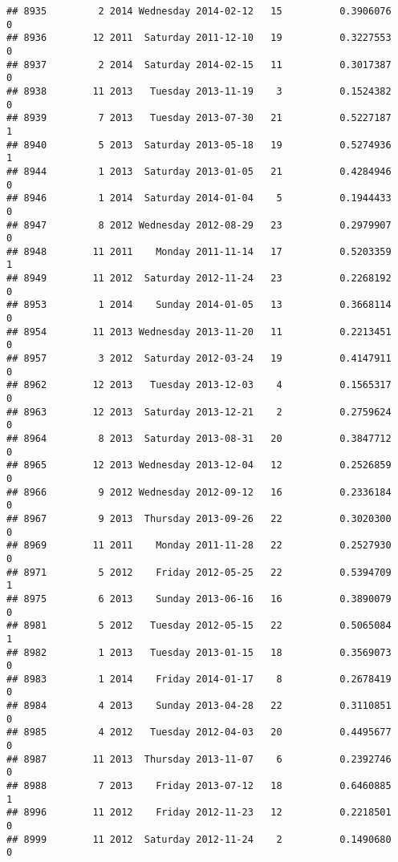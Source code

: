 \documentclass[
]{article}
\begin{document}
\begin{verbatim}
## 8935         2 2014 Wednesday 2014-02-12   15          0.3906076             0
## 8936        12 2011  Saturday 2011-12-10   19          0.3227553             0
## 8937         2 2014  Saturday 2014-02-15   11          0.3017387             0
## 8938        11 2013   Tuesday 2013-11-19    3          0.1524382             0
## 8939         7 2013   Tuesday 2013-07-30   21          0.5227187             1
## 8940         5 2013  Saturday 2013-05-18   19          0.5274936             1
## 8944         1 2013  Saturday 2013-01-05   21          0.4284946             0
## 8946         1 2014  Saturday 2014-01-04    5          0.1944433             0
## 8947         8 2012 Wednesday 2012-08-29   23          0.2979907             0
## 8948        11 2011    Monday 2011-11-14   17          0.5203359             1
## 8949        11 2012  Saturday 2012-11-24   23          0.2268192             0
## 8953         1 2014    Sunday 2014-01-05   13          0.3668114             0
## 8954        11 2013 Wednesday 2013-11-20   11          0.2213451             0
## 8957         3 2012  Saturday 2012-03-24   19          0.4147911             0
## 8962        12 2013   Tuesday 2013-12-03    4          0.1565317             0
## 8963        12 2013  Saturday 2013-12-21    2          0.2759624             0
## 8964         8 2013  Saturday 2013-08-31   20          0.3847712             0
## 8965        12 2013 Wednesday 2013-12-04   12          0.2526859             0
## 8966         9 2012 Wednesday 2012-09-12   16          0.2336184             0
## 8967         9 2013  Thursday 2013-09-26   22          0.3020300             0
## 8969        11 2011    Monday 2011-11-28   22          0.2527930             0
## 8971         5 2012    Friday 2012-05-25   22          0.5394709             1
## 8975         6 2013    Sunday 2013-06-16   16          0.3890079             0
## 8981         5 2012   Tuesday 2012-05-15   22          0.5065084             1
## 8982         1 2013   Tuesday 2013-01-15   18          0.3569073             0
## 8983         1 2014    Friday 2014-01-17    8          0.2678419             0
## 8984         4 2013    Sunday 2013-04-28   22          0.3110851             0
## 8985         4 2012   Tuesday 2012-04-03   20          0.4495677             0
## 8987        11 2013  Thursday 2013-11-07    6          0.2392746             0
## 8988         7 2013    Friday 2013-07-12   18          0.6460885             1
## 8996        11 2012    Friday 2012-11-23   12          0.2218501             0
## 8999        11 2012  Saturday 2012-11-24    2          0.1490680             0

\end{verbatim}
\end{document}
